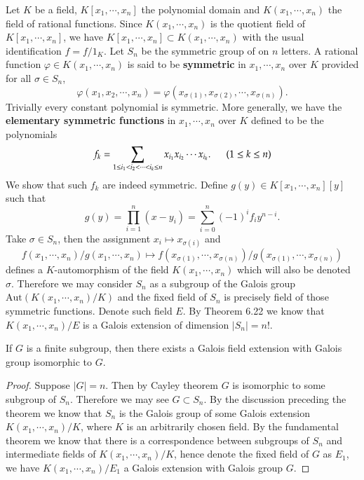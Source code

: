 Let $K$ be a field, $K[x_1,\cdots,x_n]$ the polynomial domain and $K(x_1,\cdots,x_n)$ the field of rational functions. Since $K(x_1,\cdots,x_n)$ is the quotient field of $K[x_1,\cdots,x_n]$, we have $K[x_1,\cdots,x_n]\subset K(x_1,\cdots,x_n)$ with the usual identification $f=f/1_K$. Let $S_n$ be the symmetric group of on $n$ letters. A rational function $\varphi\in K(x_1,\cdots,x_n)$ is said to be \textbf{symmetric} in $x_1,\cdots,x_n$ over $K$ provided for all $\sigma\in S_n$, 
$$
\varphi \left( x_1,x_2,\cdots ,x_n \right) =\varphi \left( x_{\sigma \left( 1 \right)},x_{\sigma \left( 2 \right)},\cdots ,x_{\sigma \left( n \right)} \right) .
$$
Trivially every constant polynomial is symmetric. More generally, we have the \textbf{elementary symmetric functions} in $x_1,\cdots,x_n$ over $K$ defined to be the polynomials 
$$
f_k=\sum_{1\le i_1<i_2<\cdots <i_k\le n}{x_{i_1}x_{i_2}\cdots x_{i_k}}.\hspace{0.5cm}\left( 1\le k\le n \right) 
$$
We show that such $f_k$ are indeed symmetric. Define $g(y)\in K[x_1,\cdots,x_n][y]$ such that 
$$
g\left( y \right) =\prod_{i=1}^n{\left( x-y_i \right)}=\sum_{i=0}^n{\left( -1 \right) ^if_iy^{n-i}}.
$$
Take $\sigma\in S_n$, then the assignment $x_i\mapsto x_{\sigma(i)}$ and 
$$
f\left( x_1,\cdots ,x_n \right) /g\left( x_1,\cdots ,x_n \right) \mapsto f\left( x_{\sigma \left( 1 \right)},\cdots ,x_{\sigma \left( n \right)} \right) /g\left( x_{\sigma \left( 1 \right)},\cdots ,x_{\sigma \left( n \right)} \right) 
$$
defines a $K$-automorphism of the field $K(x_1,\cdots,x_n)$ which will also be denoted $\sigma$. Therefore we may consider $S_n$ as a subgroup of the Galois group $\mathrm{Aut}(K(x_1,\cdots,x_n)/K)$ and the fixed field of $S_n$ is precisely field of those symmetric functions. Denote such field $E$. By Theorem 6.22 we know that $K(x_1,\cdots,x_n)/E$ is a Galois extension of dimension $|S_n|=n!$.
\begin{proposition}
If $G$ is a finite subgroup, then there exists a Galois field extension with Galois group isomorphic to $G$.
\end{proposition}
\begin{proof}
Suppose $|G|=n$. Then by Cayley theorem $G$ is isomorphic to some subgroup of $S_n$. Therefore we may see $G\subset S_n$. By the discussion preceding the theorem we know that $S_n$ is the Galois group of some Galois extension $K(x_1,\cdots,x_n)/K$, where $K$ is an arbitrarily chosen field. By the fundamental theorem we know that there is a correspondence between subgroups of $S_n$ and intermediate fields of $K(x_1,\cdots,x_n)/K$, hence denote the fixed field of $G$ as $E_1$, we have $K(x_1,\cdots,x_n)/E_1$ a Galois extension with Galois group $G$.
\end{proof}
